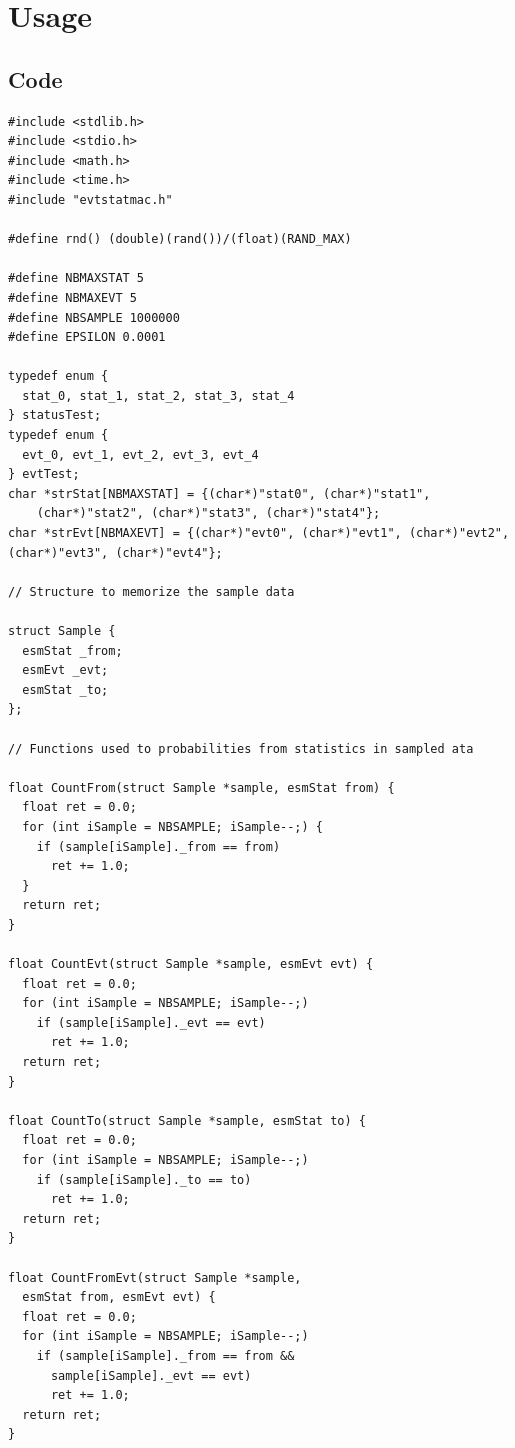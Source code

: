 \documentclass[12pt, a4paper]{article}
\begin{document}
\section{Usage}

\subsection{Code}

\begin{scriptsize}
\begin{ttfamily}
\begin{lstlisting}
#include <stdlib.h>
#include <stdio.h>
#include <math.h>
#include <time.h>
#include "evtstatmac.h"

#define rnd() (double)(rand())/(float)(RAND_MAX)

#define NBMAXSTAT 5
#define NBMAXEVT 5
#define NBSAMPLE 1000000
#define EPSILON 0.0001

typedef enum {
  stat_0, stat_1, stat_2, stat_3, stat_4
} statusTest;
typedef enum {
  evt_0, evt_1, evt_2, evt_3, evt_4
} evtTest;
char *strStat[NBMAXSTAT] = {(char*)"stat0", (char*)"stat1", 
    (char*)"stat2", (char*)"stat3", (char*)"stat4"};
char *strEvt[NBMAXEVT] = {(char*)"evt0", (char*)"evt1", (char*)"evt2", (char*)"evt3", (char*)"evt4"};

// Structure to memorize the sample data

struct Sample {
  esmStat _from;
  esmEvt _evt;
  esmStat _to;
};

// Functions used to probabilities from statistics in sampled ata

float CountFrom(struct Sample *sample, esmStat from) {
  float ret = 0.0;
  for (int iSample = NBSAMPLE; iSample--;) {
    if (sample[iSample]._from == from)
      ret += 1.0;
  }
  return ret;
}

float CountEvt(struct Sample *sample, esmEvt evt) {
  float ret = 0.0;
  for (int iSample = NBSAMPLE; iSample--;)
    if (sample[iSample]._evt == evt)
      ret += 1.0;
  return ret;
}

float CountTo(struct Sample *sample, esmStat to) {
  float ret = 0.0;
  for (int iSample = NBSAMPLE; iSample--;)
    if (sample[iSample]._to == to)
      ret += 1.0;
  return ret;
}

float CountFromEvt(struct Sample *sample, 
  esmStat from, esmEvt evt) {
  float ret = 0.0;
  for (int iSample = NBSAMPLE; iSample--;)
    if (sample[iSample]._from == from &&
      sample[iSample]._evt == evt)
      ret += 1.0;
  return ret;
}


\end{lstlisting}
\end{ttfamily}
\end{scriptsize}
\end{document}
